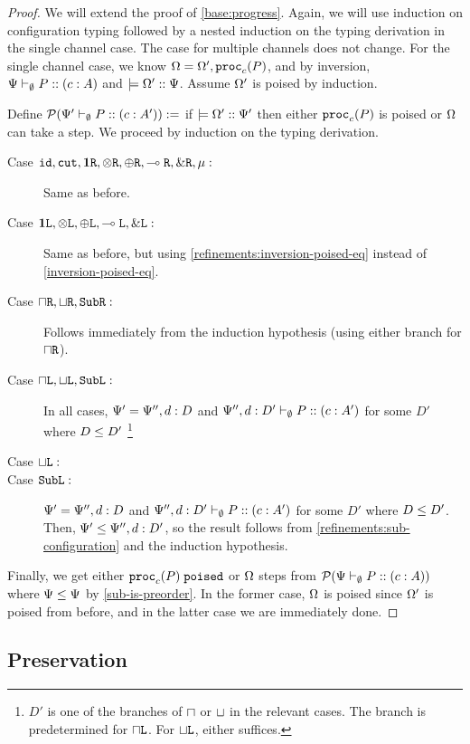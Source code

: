 \begin{proof}
We will extend the proof of \cref{base:progress}. Again, we will use induction on configuration typing followed by a nested induction on the typing derivation in the single channel case. The case for multiple channels does not change. For the single channel case, we know $\Omega = \Omega', \mathtt{proc}_{c}(P)$, and by inversion, ${\Psi} \vdash_{\emptyset} P :: (c : A)$ and $\models {\Omega'} :: {\Psi}$. Assume $\Omega'$ is poised by induction.

  Define $\pred{\typeRecD{\ctx'}{\emptyset}{P}{c}{A'}} :=$ if $\models {\Omega'} :: {\Psi'}$ then either $\mathtt{proc}_{c}(P)$ is poised or $\Omega$ can take a step. We proceed by induction on the typing derivation.
    \begin{description}
      \item[Case $\texttt{id}, \texttt{cut}, \mathbf{1}\texttt{R}, \otimes\texttt{R}, \oplus\texttt{R}, \multimap\texttt{R}, \&\texttt{R}, \mu :$] Same as before.

      \item[Case $\mathbf{1}\texttt{L}, \otimes\texttt{L}, \oplus\texttt{L}, \multimap\texttt{L}, \&\texttt{L} :$] Same as before, but using \cref{refinements:inversion-poised-eq} instead of \cref{inversion-poised-eq}.

      \item[Case $\mathbin{\sqcap}\texttt{R}, \mathbin{\sqcup}\texttt{R}, \texttt{Sub}\texttt{R} :$] Follows immediately from the induction hypothesis (using either branch for $\mathbin{\sqcap}\texttt{R}$).

      \item[Case $\mathbin{\sqcap}\texttt{L}, \mathbin{\sqcup}\texttt{L}, \texttt{Sub}\texttt{L} :$] In all cases, $\Psi' = \Psi'', d : D$ and ${\Psi'', d : D'} \vdash_{\emptyset} P :: (c : A')$ for some $D'$ where $D \le D'$%
      \footnote{$D'$ is one of the branches of $\mathbin{\sqcap}$ or $\mathbin{\sqcup}$ in the relevant cases. The branch is predetermined for  $\mathbin{\sqcap}\texttt{L}$. For $\mathbin{\sqcup}\texttt{L}$, either suffices.}

      \item[Case $\mathbin{\sqcup}\texttt{L} :$]

      \item[Case $\texttt{Sub}\texttt{L} :$] $\Psi' = \Psi'', d : D$ and ${\Psi'', d : D'} \vdash_{\emptyset} P :: (c : A')$ for some $D'$ where $D \le D'$. Then, $\Psi' \le \Psi'', d : D'$, so the result follows from \cref{refinements:sub-configuration} and the induction hypothesis.

    \end{description}

    Finally, we get either $\mathtt{proc}_{c}(P)\;\mathtt{poised}$ or $\Omega$ steps from $\pred{\typeRecD \ctx \emptyset P c A}$ where $\Psi \le \Psi$ by \cref{sub-is-preorder}. In the former case, $\Omega$ is poised since $\Omega'$ is poised from before, and in the latter case we are immediately done.
\end{proof}


\subsection{Preservation}

